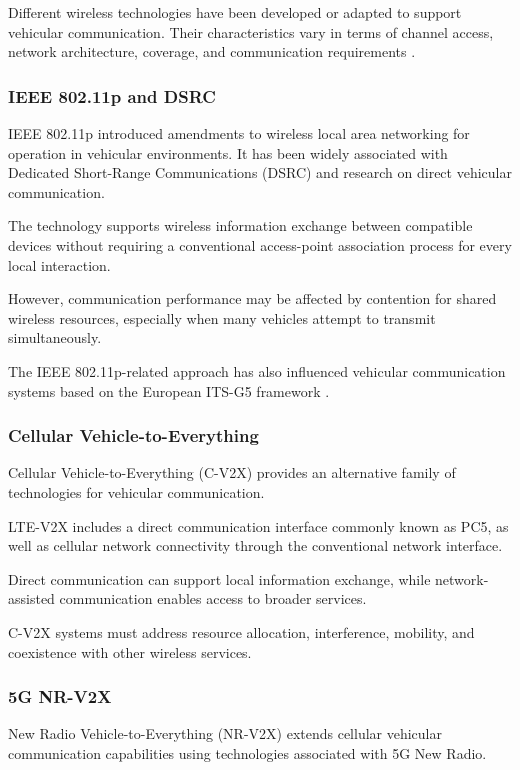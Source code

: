 Different wireless technologies have
been developed or adapted to support
vehicular communication. Their
characteristics vary in terms
of channel access, network
architecture, coverage, and
communication requirements
\cite{Karagiannis2011}.

\subsubsection{IEEE 802.11p and DSRC}

IEEE 802.11p introduced amendments
to wireless local area networking
for operation in vehicular
environments. It has been widely
associated with Dedicated
Short-Range Communications (DSRC)
and research on direct vehicular
communication.

The technology supports wireless
information exchange between
compatible devices without
requiring a conventional
access-point association process
for every local interaction.

However, communication performance
may be affected by contention
for shared wireless resources,
especially when many vehicles
attempt to transmit simultaneously.

The IEEE 802.11p-related approach
has also influenced vehicular
communication systems based
on the European ITS-G5 framework
\cite{Karagiannis2011}.

\subsubsection{Cellular Vehicle-to-Everything}

Cellular Vehicle-to-Everything
(C-V2X) provides an alternative
family of technologies for
vehicular communication.

LTE-V2X includes a direct
communication interface commonly
known as PC5, as well as
cellular network connectivity
through the conventional
network interface.

Direct communication can support
local information exchange,
while network-assisted
communication enables access
to broader services.

C-V2X systems must address
resource allocation, interference,
mobility, and coexistence
with other wireless services.

\subsubsection{5G NR-V2X}

New Radio Vehicle-to-Everything
(NR-V2X) extends cellular
vehicular communication
capabilities using technologies
associated with 5G New Radio.

